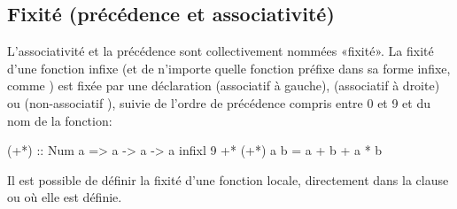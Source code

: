 \subsection{Fixité (précédence et associativité)}
\label{defining-fixity}

L'associativité et la précédence sont collectivement nommées «fixité». La fixité d'une fonction infixe (et de n'importe quelle fonction préfixe dans sa forme infixe, comme ) est fixée par une déclaration  (associatif à gauche),  (associatif à droite) ou  (non-associatif
), suivie de l'ordre de précédence compris entre 0 et 9 et du nom de la fonction:

\begin{haskellcode}
(+*) :: Num a => a -> a -> a
infixl 9 +*
(+*) a b = a + b + a * b
\end{haskellcode}

Il est possible de définir la fixité d'une fonction locale, directement dans la clause  ou  où elle est définie.
